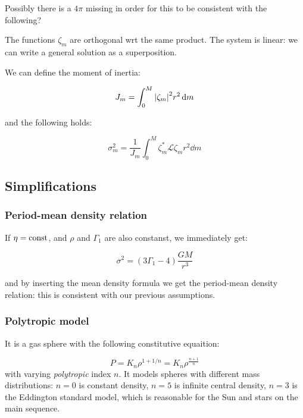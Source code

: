 \documentclass[main.tex]{subfiles}
\begin{document}
\begin{greenbox}
  Possibly there is a \(4 \pi\) missing in order for this to be consistent with the following?
\end{greenbox}

The functions \(\zeta_m\) are orthogonal wrt the same product. The system is linear: we can write a general solution as a superposition.

We can define the moment of inertia:

\begin{equation}
  J_m = \int _{0}   ^{M} \abs{\zeta_m}^2 r^2 \dd{m}
\end{equation}

and the following holds:

\begin{equation}
  \sigma_m^2 = \frac{1}{J_m} \int_0^M \zeta_m ^* \mathcal L \zeta_m r^2 \dd{m}
\end{equation}

\subsection{Simplifications}

\subsubsection{Period-mean density relation}

If \(\eta = \text{const}\), and \(\rho \) and \(\Gamma_1\) are also constanst, we immediately get:

\begin{equation}
  \sigma^2 = (3 \Gamma_1 - 4) \frac{GM}{r^3}
\end{equation}

and by inserting the mean density formula we get the period-mean density relation: this is consistent with our previous assumptions.

\subsubsection{Polytropic model}

It is a gas sphere with the following constitutive equaition:

\begin{equation}
  P = K_n \rho^{1 + 1/n} = K_n \rho^{\frac{n+1}{n}}
\end{equation}
%
with varying \emph{polytropic} index \(n\).
It models spheres with different mass distributions:
\(n=0\) is constant density, \(n=5\) is infinite central density, \(n=3\) is the Eddington standard model, which is reasonable for the Sun and stars on the main sequence.
\end{document}
